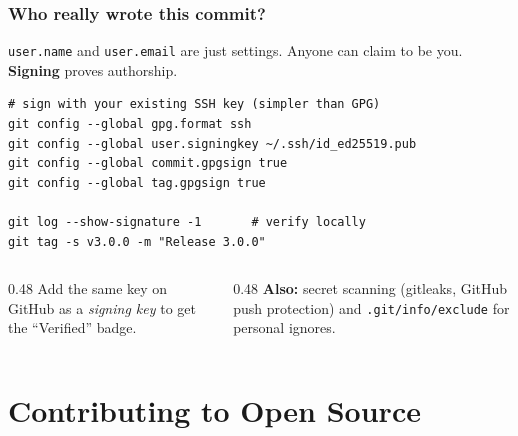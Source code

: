 \documentclass[aspectratio=169,10pt,compress]{beamer}
\newcommand{\cmd}[1]{\texttt{\color{gitred}#1}}
\begin{document}
\begin{frame}[t,fragile] \frametitle{Who really wrote this commit?}
  \cmd{user.name} and \cmd{user.email} are just settings. Anyone can claim to be you.
  \textbf{Signing} proves authorship.

\begin{lstlisting}
# sign with your existing SSH key (simpler than GPG)
git config --global gpg.format ssh
git config --global user.signingkey ~/.ssh/id_ed25519.pub
git config --global commit.gpgsign true
git config --global tag.gpgsign true

git log --show-signature -1       # verify locally
git tag -s v3.0.0 -m "Release 3.0.0"
\end{lstlisting}

  \begin{columns}[T]
    \begin{column}{0.48\textwidth}
      \small
      Add the same key on GitHub as a \emph{signing key} to get the
      ``Verified'' badge.
    \end{column}
    \begin{column}{0.48\textwidth}
      \small
      \textbf{Also:} secret scanning (gitleaks, GitHub push protection) and
      \texttt{.git/info/exclude} for personal ignores.
    \end{column}
  \end{columns}
\end{frame}

\section[OSS]{Contributing to Open Source}
\end{document}
